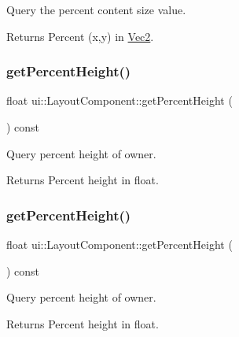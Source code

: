 Query the percent content size value. \begin{DoxyReturn}{Returns}
Percent (x,y) in \hyperlink{classVec2}{Vec2}. 
\end{DoxyReturn}
\mbox{\label{classui_1_1LayoutComponent_a45a619b652e86c0f3181dec2adba6954}} 
\subsubsection{\texorpdfstring{get\+Percent\+Height()}{getPercentHeight()}\hspace{0.1cm}{\footnotesize\ttfamily [1/2]}}
{\footnotesize\ttfamily float ui\+::\+Layout\+Component\+::get\+Percent\+Height (\begin{DoxyParamCaption}{ }\end{DoxyParamCaption}) const}

Query percent height of owner. \begin{DoxyReturn}{Returns}
Percent height in float. 
\end{DoxyReturn}
\mbox{\label{classui_1_1LayoutComponent_a45a619b652e86c0f3181dec2adba6954}} 
\subsubsection{\texorpdfstring{get\+Percent\+Height()}{getPercentHeight()}\hspace{0.1cm}{\footnotesize\ttfamily [2/2]}}
{\footnotesize\ttfamily float ui\+::\+Layout\+Component\+::get\+Percent\+Height (\begin{DoxyParamCaption}{ }\end{DoxyParamCaption}) const}

Query percent height of owner. \begin{DoxyReturn}{Returns}
Percent height in float. 
\end{DoxyReturn}
\mbox{\label{classui_1_1LayoutComponent_a79288b7cb4520b1f81ab76b2541f7209}} 
